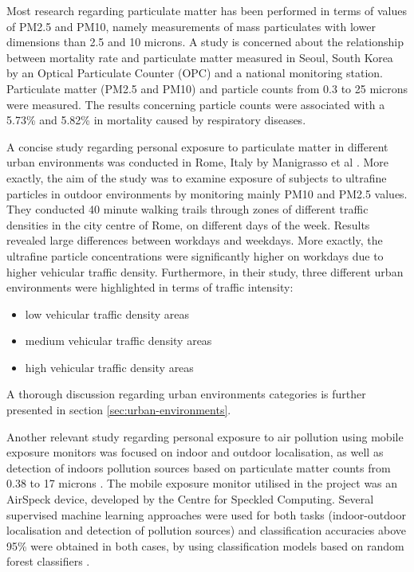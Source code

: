 \documentclass[bsc,frontabs,twoside,singlespacing, parskip,deptreport]{infthesis}     %
\begin{document}
Most research regarding particulate matter has been performed in terms of values of PM2.5 and PM10, namely measurements of mass particulates with lower dimensions than 2.5 and 10 microns. A study \cite{Cho2008} is concerned about the relationship between mortality rate and particulate matter measured in Seoul, South Korea by an Optical Particulate Counter (OPC) and a national monitoring station. Particulate matter (PM2.5 and PM10) and particle counts from 0.3 to 25 microns were measured. The results concerning particle counts were associated with a 5.73\% and 5.82\% in mortality caused by respiratory diseases.

A concise study regarding personal exposure to particulate matter in different urban environments was conducted in Rome, Italy by Manigrasso et al \cite{rome2017}. More exactly, the aim of the study was to examine exposure of subjects to ultrafine particles in outdoor environments by monitoring mainly PM10 and PM2.5 values. They conducted 40 minute walking trails through zones of different traffic densities in the city centre of Rome, on different days of the week. Results revealed large differences between workdays and weekdays. More exactly, the ultrafine particle concentrations were significantly higher on workdays due to higher vehicular traffic density. Furthermore,  in their study, three different urban environments were highlighted in terms of traffic intensity:
\begin{itemize}
\item low vehicular traffic density areas
\item medium vehicular traffic density areas
\item high vehicular traffic density areas
\end{itemize}
A thorough discussion regarding urban environments categories is further presented in section \ref{sec:urban-environments}.

Another relevant study regarding personal exposure to air pollution using mobile exposure monitors was focused on indoor and outdoor localisation, as well as detection of indoors pollution sources based on particulate matter counts from 0.38 to 17 microns \cite{buzatu2018}. The mobile exposure monitor utilised in the project was an AirSpeck device, developed by the Centre for Speckled Computing. Several supervised machine learning approaches were used for both tasks (indoor-outdoor localisation and detection of pollution sources) and classification accuracies above 95\% were obtained in both cases, by using classification models based on random forest classifiers \cite{randomForest}.
\end{document}

